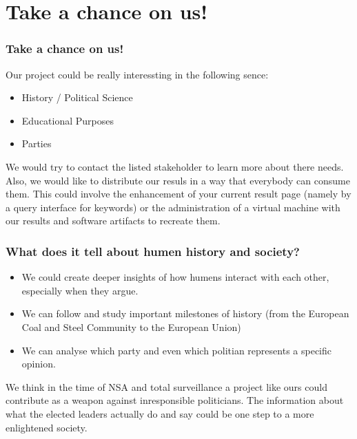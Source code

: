 \documentclass[11pt, a4paper]{beamer}
\begin{document}
\section{Take a chance on us!}
\begin{frame}
\frametitle{Take a chance on us!}
Our project could be really interessting in the following sence:
\begin{itemize}
\item History / Political Science  
\item Educational Purposes
\item Parties 
\end{itemize}
We would try to contact the listed stakeholder to learn more about there needs.\\

Also, we would like to distribute our resuls in a way that everybody can consume them. 
This could involve the enhancement of your current result page (namely by a query interface for keywords) or the 
administration of a virtual machine with our results and software artifacts to recreate them.
\end{frame}

\begin{frame}
\frametitle{What does it tell about humen history and society?}
\begin{itemize}
\item We could create deeper insights of how humens interact with each other, especially when they argue.
\item We can follow and study important milestones of history (from the European Coal and Steel Community to the European Union)
\item We can analyse which party and even which politian represents a specific opinion.
\end{itemize}
We think in the time of NSA and total surveillance a project like ours could contribute as a weapon against inresponsible politicians. 
The information about what the elected leaders actually do and say could be one step to a more enlightened society.

\end{frame}

\printbibliography
\end{document}
